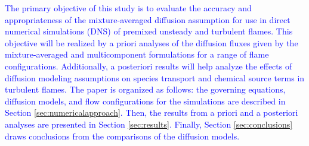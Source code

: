 \documentclass[preprint,review,12pt]{elsarticle}
\begin{document}

\textcolor{blue}{The primary objective of this study is to evaluate the accuracy and appropriateness of the mixture-averaged diffusion assumption for use in direct numerical simulations (DNS) of premixed unsteady and turbulent flames.
This objective will be realized by a priori analyses of the diffusion fluxes given by the mixture-averaged and multicomponent formulations for a range of flame configurations.
Additionally, a posteriori results will help analyze the effects of diffusion modeling assumptions on species transport and chemical source terms in turbulent flames.
The paper is organized as follows: the governing equations, diffusion models, and flow configurations for the simulations are described in Section \ref{sec:numericalapproach}.
Then, the results from a priori and a posteriori analyses are presented in Section \ref{sec:results}.
Finally, Section \ref{sec:conclusions} draws conclusions from the comparisons of the diffusion models.}
\end{document}
